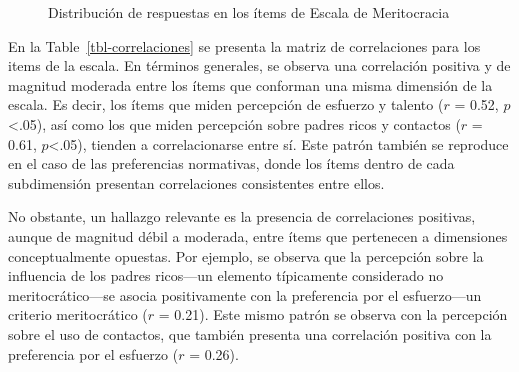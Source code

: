 \documentclass[
  12pt,
]{article}
\begin{document}
\begin{figure}

\caption{\label{fig-likert}Distribución de respuestas en los ítems de
Escala de Meritocracia}


\end{figure}%

En la Table~\ref{tbl-correlaciones} se presenta la matriz de
correlaciones para los items de la escala. En términos generales, se
observa una correlación positiva y de magnitud moderada entre los ítems
que conforman una misma dimensión de la escala. Es decir, los ítems que
miden percepción de esfuerzo y talento (\(r\) = 0.52,
\(p\)\textless.05), así como los que miden percepción sobre padres ricos
y contactos (\(r\) = 0.61, \(p\)\textless.05), tienden a correlacionarse
entre sí. Este patrón también se reproduce en el caso de las
preferencias normativas, donde los ítems dentro de cada subdimensión
presentan correlaciones consistentes entre ellos.

No obstante, un hallazgo relevante es la presencia de correlaciones
positivas, aunque de magnitud débil a moderada, entre ítems que
pertenecen a dimensiones conceptualmente opuestas. Por ejemplo, se
observa que la percepción sobre la influencia de los padres ricos---un
elemento típicamente considerado no meritocrático---se asocia
positivamente con la preferencia por el esfuerzo---un criterio
meritocrático (\(r\) = 0.21). Este mismo patrón se observa con la
percepción sobre el uso de contactos, que también presenta una
correlación positiva con la preferencia por el esfuerzo (\(r\) = 0.26).
\end{document}
